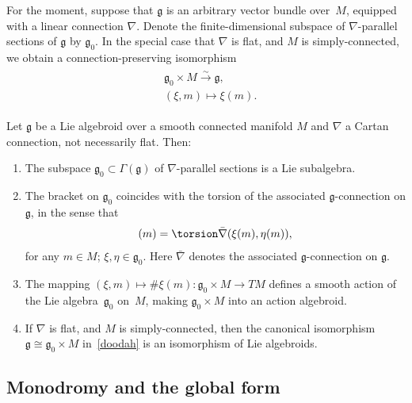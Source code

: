 For the moment, suppose that $\mathfrak g$ is an arbitrary vector
bundle over~$M$, equipped with a linear connection $\nabla$. Denote
the f\/inite-dimensional subspace of $\nabla $-parallel sections of
$\mathfrak g$ by ${\mathfrak g}_0$. In the special case that $\nabla$
is f\/lat, and $M$ is simply-connected, we obtain a
connection-preserving isomorphism
\begin{gather}
  \begin{split}
 &   {\mathfrak g}_0 \times M\xrightarrow{\sim}{\mathfrak g}, \\
 &   (\xi,m)\mapsto \xi(m).
  \end{split}
  \label{doodah}
\end{gather}
\begin{PropositionBlaom} \label{Proposition2.5}
  Let $\mathfrak g$ be a Lie algebroid over a smooth connected
  manifold $M$ and $\nabla$ a Cartan connection, not necessarily
  flat. Then:
  \begin{enumerate}\itemsep=0pt
  \item[$(1)$] The subspace ${\mathfrak g}_0 \subset \Gamma({\mathfrak g})$
    of $\nabla$-parallel sections is a Lie subalgebra.
  \item[$(2)$] %
  The bracket on ${\mathfrak g}_0$ coincides with
    the torsion of the associated $\mathfrak g$-connection on
    ${\mathfrak g} $, in the sense that
    \begin{gather*}
      [\xi,\eta](m)=\torsion \bar\nabla (\xi(m),\eta(m)),
    \end{gather*}
    for any $m\in M$; $\xi,\eta \in {\mathfrak g}_0$. Here
    $\bar\nabla$ denotes the associated ${\mathfrak g} $-connection on
    $\mathfrak g$.
  \item[$(3)$] %
  The mapping $(\xi,m) \mapsto \# \xi(m) \colon
    {\mathfrak g}_0 \times M \rightarrow TM$ defines a smooth action
    of the Lie algebra~${\mathfrak g}_0$ on~$M$, making ${\mathfrak
      g}_0 \times M$ into an action algebroid.

  \item[$(4)$]%
  If $\nabla$ is flat, and $M$ is simply-connected,
    then the canonical isomorphism ${\mathfrak g} \cong {\mathfrak
      g}_0 \times M$ in~\eqref{doodah} is an isomorphism of Lie
    algebroids.
\end{enumerate}
\end{PropositionBlaom}

\subsection{Monodromy and  the global form}\label{holiday}

